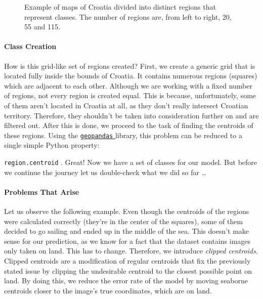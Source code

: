 \documentclass[]{article}
\let\oldparagraph\paragraph
\renewcommand{\paragraph}[1]{\oldparagraph{#1}\mbox{}}
\let\oldtexttt\texttt
\renewcommand{\texttt}[1]{
  \textcolor{tcolor}{\colorbox{bgcolor}{\oldtexttt{#1}}}
}
\begin{document}
\begin{figure}[!h]
\caption{Example of maps of Croatia divided into distinct regions that represent classes. The number of regions are, from left to right, 20, 55 and 115.}
\end{figure}

\hypertarget{class-creation}{%
\paragraph{Class Creation}\label{class-creation}}

How is this grid-like set of regions created? First, we create a generic
grid that is located fully inside the bounds of Croatia. It contains
numerous regions (squares) which are adjacent to each other. Although we
are working with a fixed number of regions, not every region is created
equal. This is because, unfortunately, some of them aren't located in
Croatia at all, as they don't really intersect Croatian territory.
Therefore, they shouldn't be taken into consideration further on and are
filtered out. After this is done, we proceed to the task of finding the
centroids of these regions. Using the
\href{https://geopandas.org/en/stable/}{\texttt{geopandas}} library,
this problem can be reduced to a single simple Python property:
\texttt{region.centroid}. Great! Now we have a set of classes for our
model. But before we continue the journey let us double-check what we
did so far \ldots{}

\hypertarget{problems-that-arise}{%
\paragraph{Problems That Arise}\label{problems-that-arise}}

Let us observe the following example. Even though the centroids of the
regions were calculated correctly (they're in the center of the
squares), some of them decided to go sailing and ended up in the middle
of the sea. This doesn't make sense for our prediction, as we know for a
fact that the dataset contains images only taken on land. This has to
change. Therefore, we introduce \emph{clipped centroids}. Clipped
centroids are a modification of regular centroids that fix the
previously stated issue by clipping the undesirable centroid to the
closest possible point on land. By doing this, we reduce the error rate
of the model by moving seaborne centroids closer to the image's true
coordinates, which are on land.
\end{document}
